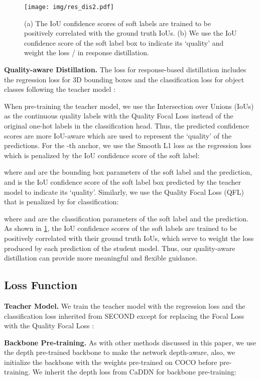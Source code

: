 \documentclass[runningheads]{llncs}
\begin{document}
\begin{figure}[t]
    \centering
    \texttt{[image: img/res\_dis2.pdf]}
    \caption{(a) The IoU confidence scores of soft labels are trained to be positively correlated with the ground truth IoUs.
    (b) We use the IoU confidence score of the soft label box to indicate its `quality' and weight the loss / in response distillation.
    }
    \label{fig:response distillation}
\end{figure}

\textbf{Quality-aware Distillation.} The loss for response-based distillation includes the regression loss  for 3D bounding boxes and the classification loss  for object classes following the teacher model \cite{second}:

When pre-training the teacher model, we use the Intersection over Unions (IoUs) as the continuous quality labels with the Quality Focal Loss \cite{gfl} instead of the original one-hot labels in the classification head.
Thus, the predicted confidence scores are more IoU-aware which are used to represent the `quality' of the predictions.
For the -th anchor, we use the Smooth L1 loss as the regression loss which is penalized by the IoU confidence score of the soft label:

where  and  are the bounding box parameters of the soft label and the prediction, and  is the IoU confidence score of the soft label box predicted by the teacher model to indicate its `quality'. 
Similarly, we use the Quality Focal Loss (QFL) \cite{gfl} that is penalized by  for classification:

where  and  are the classification parameters of the soft label and the prediction.
As shown in \cref{fig:response distillation}, the IoU confidence scores of the soft labels are trained to be positively correlated with their ground truth IoUs, which serve to weight the loss produced by each prediction of the student model.
Thus, our quality-aware distillation can provide more meaningful and flexible guidance.

\subsection{Loss Function}
\textbf{Teacher Model.}
We train the teacher model with the regression loss  and the classification loss  inherited from SECOND \cite{second} except for replacing the Focal Loss \cite{lin2017focal} with the Quality Focal Loss \cite{gfl}:


\noindent\textbf{Backbone Pre-training.}
As with other methods discussed in this paper, we use the depth pre-trained backbone to make the network depth-aware, also, we initialize the backbone with the weights pre-trained on COCO \cite{lin2014microsoftcoco} before pre-training.
We inherit the depth loss from CaDDN \cite{CADDN} for backbone pre-training:
\end{document}
